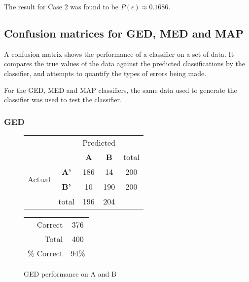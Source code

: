 The result for Case 2 was found to be $P(\epsilon)\approx0.1686$.
 
\subsection{Confusion matrices for GED, MED and MAP}

A confusion matrix shows the performance of a classifier on a set of data. It compares the true values of the data against the predicted classifications by the classifier, and attempts to quantify the types of errors being made.

For the GED, MED and MAP classifiers, the same data used to generate the classifier was used to test the classifier.

\clearpage

\subsubsection{GED}
\begin{figure}[!ht]
\begin{minipage}[b]{0.5\linewidth}
\centering
	\begin{tabular}{ccc|c|c}
	 & &\multicolumn{2}{c}{Predicted} &\\
	  & & \bf{A} &  \bf{B} & total \\
	 \cline{3-5}
	 \multirow{2}{*}{\begin{sideways}Actual\end{sideways}} & \bf{A'}& 186 & 14 & 200 \\
	 \cline{3-5}
	 & \bf{B'}& 10 & 190 & 200 \\
	  \cline{3-5}
	 &total&196&204&\\
	\end{tabular}
\end{minipage}
\hspace{0.5cm}
\begin{minipage}[b]{0.5\linewidth}
	\begin{tabular}{r|c}
	\hline
	Correct& 376\\
	Total& 400\\
	\hline
	\% Correct& 94\%\\
	\hline
	\end{tabular}
\end{minipage}
\vspace{1mm}
\caption{GED performance on A and B}
\end{figure}

